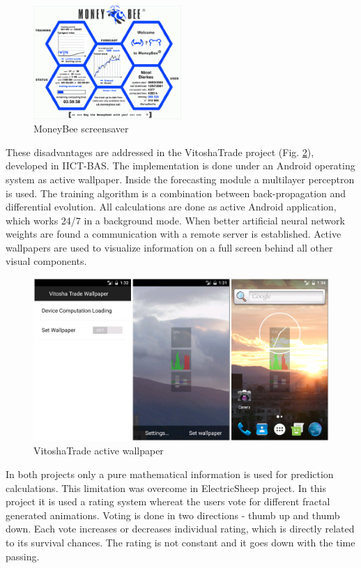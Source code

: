 \documentclass[11pt]{article}
\begin{document}
\begin{figure}
\includegraphics[width=0.5\textwidth]{fig01.png}
\centering
\caption{MoneyBee screensaver} \label{fig01}
\end{figure}
\FloatBarrier

These disadvantages are addressed in the VitoshaTrade project (Fig. \ref{fig02}), developed in IICT-BAS. The implementation is done under an Android operating system as active wallpaper. Inside the forecasting module a multilayer perceptron is used. The training algorithm is a combination between back-propagation and differential evolution. All calculations are done as active Android application, which works 24/7 in a background mode. When better artificial neural network weights are found a communication with a remote server is established. Active wallpapers are used to visualize information on a full screen behind all other visual components. 

\begin{figure}
\includegraphics[width=1.0\textwidth]{fig02.png}
\centering
\caption{VitoshaTrade active wallpaper} \label{fig02}
\end{figure}
\FloatBarrier

In both projects only a pure mathematical information is used for prediction calculations. This limitation was overcome in ElectricSheep\cite{draves01} project. In this project it is used a rating system whereat the users vote for different fractal generated animations. Voting is done in two directions - thumb up and thumb down. Each vote increases or decreases individual rating, which is directly related to its survival chances. The rating is not constant and it goes down with the time passing. 
\end{document}
